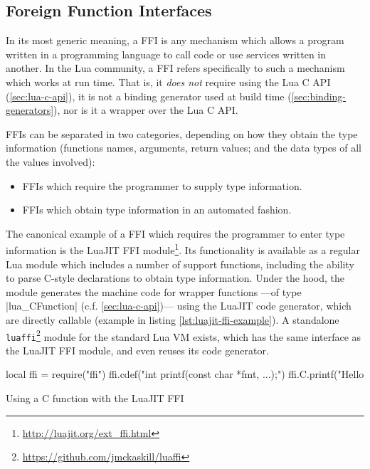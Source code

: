 \subsection{Foreign Function Interfaces}
	\label{sec:ffis}

In its most generic meaning, a \gls{FFI} is any mechanism which allows
a program written in a programming language to call code or use services
written in another. In the Lua community, a FFI refers specifically to such
a mechanism which works at run time. That is, it \emph{does not} require using
the Lua C API (\autoref{sec:lua-c-api}), it is not a binding generator used at
build time (\autoref{sec:binding-generators}), nor is it a wrapper over the
Lua C API.

FFIs can be separated in two categories, depending on how they obtain the type
information (functions names, arguments, return values; and the data types of
all the values involved):

\begin{itemize}

	\item FFIs which require the programmer to supply type information.

	\item FFIs which obtain type information in an automated fashion.

\end{itemize}

The canonical example of a FFI which requires the programmer to enter type
information is the \gls{LuaJIT} FFI
module\footnote{\url{http://luajit.org/ext_ffi.html}}. Its functionality is
available as a regular Lua module which includes a number of support
functions, including the ability to parse C-style declarations to obtain type
information. Under the hood, the module generates the machine code for wrapper
functions —of type \Mc|lua_CFunction| (c.f. \autoref{sec:lua-c-api})— using
the LuaJIT code generator, which are directly callable (example in listing
\autoref{lst:luajit-ffi-example}). A standalone
\verb|luaffi|\footnote{\url{https://github.com/jmckaskill/luaffi}} module for
the standard Lua \gls{VM} exists, which has the same interface as the LuaJIT
FFI module, and even reuses its code generator.

\begin{listing}[H]
	\begin{luacode}
  local ffi = require("ffi")
  ffi.cdef("int printf(const char *fmt, ...);")
  ffi.C.printf("Hello %
	\end{luacode}
	\caption{Using a C function with the LuaJIT FFI}
	\label{lst:luajit-ffi-example}
\end{listing}

